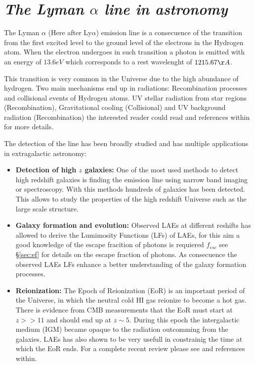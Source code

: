  

\section{\emph{The Lyman $\alpha$ line in astronomy}}\label{sec:lyuses}

The Lyman $\alpha$ (Here after Ly$\alpha$) emission line is a consecuence of the 
transition 
from the first excited level to the ground level of the electrons
in the Hydrogen atom. When the electron undergoes in such transition 
a photon is emitted with an energy of $13.6eV$ which corresponds to 
a rest wavelenght of $1215.67 \AA$. 

This transition is very common in the Universe due to the high abundance
of hydrogen. Two main mechanisms end up in \ly radiations: Recombination 
processes and collisional events of Hydrogen atoms. UV stellar radiation
from star regions (Recombination), Gravitational 
cooling (Collisional) and UV background radiation (Recombination) the interested
reader could read \citep{LaursenPhD} and references within for
more details. 

The detection of the \ly line has been broadly studied and has multiple 
applications in extragalactic astronomy:

\begin{itemize}
\item {\bf{Detection of high $z$ galaxies:}} One of the most used 
methods to detect high redshift galaxies is finding the \ly emission 
line using narrow band imaging or spectroscopy. With this methods 
hundreds of galaxies has been detected. This 
allows to study the properties of the high redshift Universe such as
the large scale structure. 
 
\item {\bf{Galaxy formation and evolution:}} Observed LAEs at different
reshifts has allowed to derive the Lumimosity Functions (LFs) of LAEs, 
for this aim a good knowledge of the escape fracition of 
photons is requiered $f_{esc}$ see \S \ref{sec:ef} for details on the escape 
fraction of \ly photons. As consecuence the observed LAEs LFs enhance a
better understanding of the galaxy formation processes. 

\item {\bf{Reionization:}} The Epoch of Reionization (EoR) is an important
period of the Universe, in which the neutral cold HI gas reionize to 
become a hot gas. There is evidence from CMB measurements that 
the EoR must start at $z >> 11$ and should end up at $z\sim5$. During this 
epoch the intergalactic medium (IGM) became opaque to the \ly radiation 
outcomming from the galaxies. LAEs has also shown to be 
very usefull in constrainig the time at which the EoR ends. 
For a complete recent review please see \citep{review} and references
within.
 
\end{itemize}


